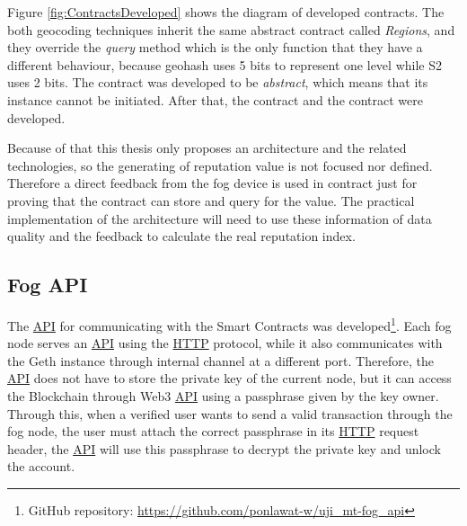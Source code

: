 \npara Figure \ref{fig:ContractsDeveloped} shows the diagram of developed contracts.
The both geocoding techniques inherit the same abstract contract called \textit{Regions}, and they override the \textit{query} method which is the only function that they have a different behaviour, because geohash uses 5 bits to represent one level while S2 uses 2 bits.
The  contract was developed to be \textit{abstract}, which means that its instance cannot be initiated.
After that, the  contract and the  contract were developed.

\npara Because of that this thesis only proposes an architecture and the related technologies, so the generating of reputation value is not focused nor defined.
Therefore a direct feedback from the fog device is used in  contract just for proving that the contract can store and query for the value.
The practical implementation of the architecture will need to use these information of data quality and the feedback to calculate the real reputation index.

\subsection{Fog API}

\npara The \hyperref[Acronym-API]{API} for communicating with the Smart Contracts was developed\footnote{GitHub repository: \url{https://github.com/ponlawat-w/uji_mt-fog_api}}.
Each fog node serves an \hyperref[Acronym-API]{API} using the \hyperref[Acronym-HTTP]{HTTP} protocol, while it also communicates with the Geth instance through internal channel at a different port.
Therefore, the \hyperref[Acronym-API]{API} does not have to store the private key of the current node, but it can access the Blockchain through Web3 \hyperref[Acronym-API]{API} using a passphrase given by the key owner.
Through this, when a verified user wants to send a valid transaction through the fog node, the user must attach the correct passphrase in its \hyperref[Acronym-HTTP]{HTTP} request header, the \hyperref[Acronym-API]{API} will use this passphrase to decrypt the private key and unlock the account.

